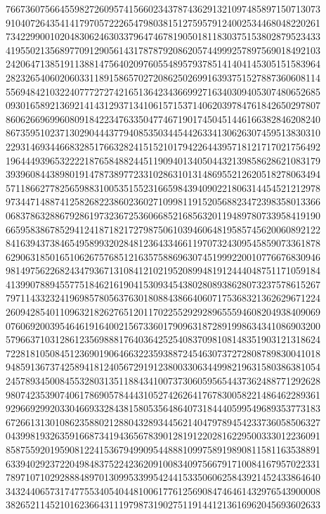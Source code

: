 {{    7667360756645598272609574156602343787436291321097485897150713073 ~
    9104072643541417970572226547980381512759579124002534468048220261 ~
    7342299001020483062463033796474678190501811830375153802879523433 ~
    4195502135689770912905614317878792086205744999257897569018492103 ~
    2420647138519113881475640209760554895793785141404145305151583964 ~
    2823265406020603311891586570272086250269916393751527887360608114 ~
    5569484210322407772727421651364234366992716340309405307480652685 ~
    0930165892136921414312937134106157153714062039784761842650297807 ~
    8606266969960809184223476335047746719017450451446166382846208240 ~
    8673595102371302904443779408535034454426334130626307459513830310 ~
    2293146934466832851766328241515210179422644395718121717021756492 ~
    1964449396532222187658488244511909401340504432139858628621083179 ~
    3939608443898019147873897723310286310131486955212620518278063494 ~
    5711866277825659883100535155231665984394090221806314454521212978 ~
    9734471488741258268223860236027109981191520568823472398358013366 ~
    0683786328867928619732367253606685216856320119489780733958419190 ~
    6659583867852941241871821727987506103946064819585745620060892122 ~
    8416394373846549589932028481236433466119707324309545859073361878 ~
    6290631850165106267576851216357588696307451999220010776676830946 ~
    9814975622682434793671310841210219520899481912444048751171059184 ~
    4139907889455775184621619041530934543802808938628073237578615267 ~
    7971143323241969857805637630180884386640607175368321362629671224 ~
    2609428540110963218262765120117022552929289655594608204938409069 ~
    0760692003954646191640021567336017909631872891998634341086903200 ~
    5796637103128612356988817640364252540837098108148351903121318624 ~
    7228181050845123690190646632235938872454630737272808789830041018 ~
    9485913673742589418124056729191238003306344998219631580386381054 ~
    2457893450084553280313511884341007373060595654437362488771292628 ~
    9807423539074061786905784443105274262641767830058221486462289361 ~
    9296692992033046693328438158053564864073184440599549689353773183 ~
    6726613130108623588021288043289344562140479789454233736058506327 ~
    0439981932635916687341943656783901281912202816229500333012236091 ~
    8587559201959081224153679499095448881099758919890811581163538891 ~
    6339402923722049848375224236209100834097566791710084167957022331 ~
    7897107102928884897013099533995424415335060625843921452433864640 ~
    3432440657317477553405404481006177612569084746461432976543900008 ~
    3826521145210162366431119798731902751191441213616962045693602633 ~
}}
